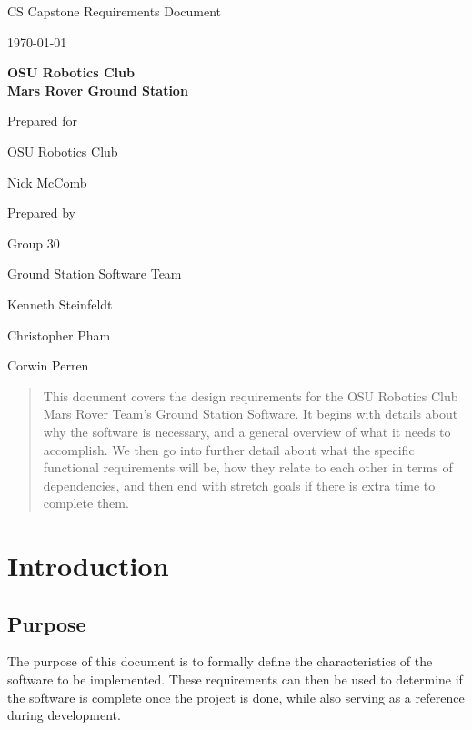 \documentclass[onecolumn, draftclsnofoot, 10pt, compsoc]{IEEEtran}
\def \CapstoneTeamName{			Ground Station Software Team}
\def \CapstoneTeamNumber{		30}
\def \GroupMemberOne{			Kenneth Steinfeldt}
\def \GroupMemberTwo{			Christopher Pham}
\def \GroupMemberThree{			Corwin Perren}
\def \CapstoneProjectName{		OSU Robotics Club\\Mars Rover Ground Station}
\def \CapstoneSponsorCompany{	OSU Robotics Club}
\def \CapstoneSponsorPerson{	Nick McComb}
\def \DocType{	%
				Requirements Document
			 }
\newcommand{\NameSigPair}[1]{
  \par
  \makebox[2.75in][r]{#1} 
  \hfill
  \makebox[3.25in]{
      \makebox[2.25in]{\hrulefill} 
      \hfill
      \makebox[.75in]{\hrulefill}
  }
  \par\vspace{-12pt} 
  \textit{
      \tiny\noindent
      \makebox[2.75in]{} 
      \hfill
      \makebox[3.25in]{
          \makebox[2.25in][r]{Signature} 
          \hfill
          \makebox[.75in][r]{Date}
      }
  }
}
\renewcommand{\NameSigPair}[1]{#1}
\begin{document}
\begin{titlepage}
\begin{singlespace}
		\par\vspace{.35in}
		\centering
		\scshape{
			\huge CS Capstone \DocType \par
			{\large\today}\par
			\vspace{.5in}
			\textbf{\Huge\CapstoneProjectName}\par
			\vfill
			{\large Prepared for}\par
			\Huge \CapstoneSponsorCompany\par
			\vspace{5pt}
			{\Large\NameSigPair{\CapstoneSponsorPerson}\par}
			{\large Prepared by }\par
			Group\CapstoneTeamNumber\par
			\CapstoneTeamName\par 
			\vspace{5pt}
			{\Large
				\NameSigPair{\GroupMemberOne}\par
				\NameSigPair{\GroupMemberTwo}\par
				\NameSigPair{\GroupMemberThree}\par
			}
			\vspace{20pt}
            \begin{abstract}
            This document covers the design requirements for the OSU Robotics Club Mars Rover Team's Ground Station Software.
            It begins with details about why the software is necessary, and a general overview of what it needs to accomplish.
            We then go into further detail about what the specific functional requirements will be, how they relate to each other in terms of dependencies, and then end with stretch goals if there is extra time to complete them.

		\end{abstract}
		}
	\end{singlespace}
\end{titlepage}
\newpage
{}
\tableofcontents
\clearpage

\section{Introduction}
\subsection{Purpose}
The purpose of this document is to formally define the characteristics of the software to be implemented. 
These requirements can then be used to determine if the software is complete once the project is done, while also serving as a reference during development.
\end{document}
